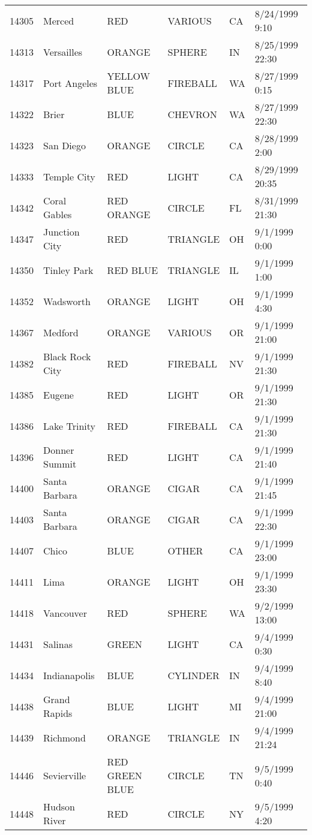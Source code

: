 \begin{tabular}{llllll}
14305 & Merced & RED & VARIOUS & CA & 8/24/1999 9:10 \\
14313 & Versailles & ORANGE & SPHERE & IN & 8/25/1999 22:30 \\
14317 & Port Angeles & YELLOW BLUE & FIREBALL & WA & 8/27/1999 0:15 \\
14322 & Brier & BLUE & CHEVRON & WA & 8/27/1999 22:30 \\
14323 & San Diego & ORANGE & CIRCLE & CA & 8/28/1999 2:00 \\
14333 & Temple City & RED & LIGHT & CA & 8/29/1999 20:35 \\
14342 & Coral Gables & RED ORANGE & CIRCLE & FL & 8/31/1999 21:30 \\
14347 & Junction City & RED & TRIANGLE & OH & 9/1/1999 0:00 \\
14350 & Tinley Park & RED BLUE & TRIANGLE & IL & 9/1/1999 1:00 \\
14352 & Wadsworth & ORANGE & LIGHT & OH & 9/1/1999 4:30 \\
14367 & Medford & ORANGE & VARIOUS & OR & 9/1/1999 21:00 \\
14382 & Black Rock City & RED & FIREBALL & NV & 9/1/1999 21:30 \\
14385 & Eugene & RED & LIGHT & OR & 9/1/1999 21:30 \\
14386 & Lake Trinity & RED & FIREBALL & CA & 9/1/1999 21:30 \\
14396 & Donner Summit & RED & LIGHT & CA & 9/1/1999 21:40 \\
14400 & Santa Barbara & ORANGE & CIGAR & CA & 9/1/1999 21:45 \\
14403 & Santa Barbara & ORANGE & CIGAR & CA & 9/1/1999 22:30 \\
14407 & Chico & BLUE & OTHER & CA & 9/1/1999 23:00 \\
14411 & Lima & ORANGE & LIGHT & OH & 9/1/1999 23:30 \\
14418 & Vancouver & RED & SPHERE & WA & 9/2/1999 13:00 \\
14431 & Salinas & GREEN & LIGHT & CA & 9/4/1999 0:30 \\
14434 & Indianapolis & BLUE & CYLINDER & IN & 9/4/1999 8:40 \\
14438 & Grand Rapids & BLUE & LIGHT & MI & 9/4/1999 21:00 \\
14439 & Richmond & ORANGE & TRIANGLE & IN & 9/4/1999 21:24 \\
14446 & Sevierville & RED GREEN BLUE & CIRCLE & TN & 9/5/1999 0:40 \\
14448 & Hudson River & RED & CIRCLE & NY & 9/5/1999 4:20 \\

\end{tabular}
